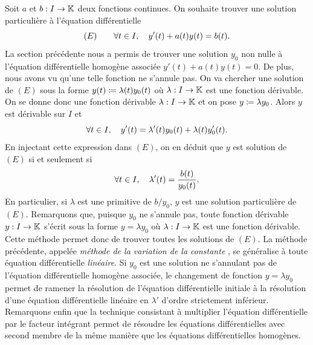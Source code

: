 \documentclass{magnoliaold}
\begin{document}
\begin{remarques}
\remarque
  Soit $a$ et $b:I\to\mathbb{K}$ deux fonctions continues. On souhaite trouver une solution
  particulière à l'équation différentielle
  \[(E) \qquad \forall t\in I ,\quad y'(t)+a(t)y(t)=b(t).\]
  La section précédente nous a permis de trouver une solution
  $y_0$ non nulle à l'équation différentielle homogène associée $y'(t)+a(t) y(t)=0$.
  De plus, nous avons vu qu'une telle fonction ne s'annule pas. On va chercher une solution
  de $(E)$ sous la forme $y(t)\coloneqq \lambda(t) y_0(t)$ où $\lambda:I\to\mathbb{K}$ est une
  fonction dérivable. On se donne donc une fonction dérivable $\lambda:I\to\mathbb{K}$
  et on pose $y\coloneqq\lambda y_0$.  Alors $y$ est dérivable sur $I$ et
  \[\forall t\in I ,\quad y'(t)=\lambda'(t)y_0(t)+\lambda(t)y_0'(t).\]
  En injectant cette expression dans $(E)$, on en déduit que $y$ est
  solution de $(E)$ si et seulement si
  \[\forall t\in I ,\quad \lambda'(t)=\frac{b(t)}{y_0(t)}.\]
  En particulier, si $\lambda$ est une primitive de $b/y_0$, $y$ est
  une solution \og particulière \fg de $(E)$. Remarquons que, puisque
  $y_0$ ne s'annule pas, toute fonction dérivable $y:I\to\mathbb{K}$ s'écrit sous la forme $y=\lambda y_0$ où
  $\lambda:I\to\mathbb{K}$ est une fonction dérivable.
  Cette méthode permet donc de trouver toutes les solutions de $(E)$.
\remarque La méthode précédente, appelée \og
  \textit{méthode de la variation de la constante} \fg,
  se généralise à toute équation différentielle \textit{linéaire}. Si $y_0$ est une
  solution ne s'annulant pas de l'équation différentielle homogène associée,
  le changement de fonction
  $y=\lambda y_0$ permet de ramener la résolution de l'équation différentielle
  initiale à la résolution d'une équation différentielle linéaire en $\lambda'$
  d'ordre strictement inférieur.
\remarque Remarquons enfin que la technique consistant à multiplier l'équation différentielle par le facteur
  intégrant permet de résoudre les équations différentielles avec second membre de la même manière que
  les équations différentielles homogènes.
\end{remarques}
\vspace{2ex}
\end{document}
